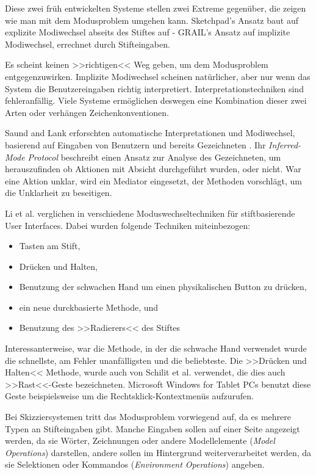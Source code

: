 \medskip Diese zwei früh entwickelten Systeme stellen zwei Extreme gegenüber, die zeigen wie man mit dem Modusproblem umgehen kann. Sketchpad's Ansatz baut auf explizite Modiwechsel abseits des Stiftes auf - GRAIL's Ansatz auf implizite Modiwechsel, errechnet durch Stifteingaben.

\medskip Es scheint keinen >>richtigen<< Weg geben, um dem Modusproblem entgegenzuwirken. Implizite Modiwechsel scheinen natürlicher, aber nur wenn das System die Benutzereingaben richtig interpretiert. Interpretationstechniken sind fehleranfällig. Viele Systeme ermöglichen deswegen eine Kombination dieser zwei Arten oder verhängen Zeichenkonventionen.

\medskip Saund and Lank erforschten automatische Interpretationen und Modiwechsel, basierend auf Eingaben von Benutzern und bereits Gezeichneten \citep{Saund:2003p66}. Ihr \emph{Inferred-Mode Protocol} beschreibt einen Ansatz zur Analyse des Gezeichneten, um herauszufinden ob Aktionen mit Absicht durchgeführt wurden, oder nicht. War eine Aktion unklar, wird ein Mediator eingesetzt, der Methoden vorschlägt, um die Unklarheit zu beseitigen.

\medskip Li et al. verglichen in \citep{Li:2005} verschiedene Moduswechseltechniken für stiftbasierende User Interfaces. Dabei wurden folgende Techniken miteinbezogen: 
\begin{itemize}
	\item Tasten am Stift,
	\item Drücken und Halten,
	\item Benutzung der schwachen Hand um einen physikalischen Button zu drücken,
	\item ein neue durckbasierte Methode, und
	\item Benutzung des >>Radierers<< des Stiftes
\end{itemize}

Interessanterweise, war die Methode, in der die schwache Hand verwendet wurde die schnellste, am Fehler unanfälligsten und die beliebteste. Die >>Drücken und Halten<< Methode, wurde auch von Schilit et al. \citep{Schilit:1998} verwendet, die dies auch >>Rast<<-Geste bezeichneten. Microsoft Windows for Tablet PCs benutzt diese Geste beispielsweise um die Rechtsklick-Kontextmenüs aufzurufen.

\medskip Bei Skizziersystemen tritt das Modusproblem vorwiegend auf, da es mehrere Typen an Stifteingaben gibt. Manche Eingaben sollen auf einer Seite angezeigt werden, da sie Wörter, Zeichnungen oder andere Modellelemente (\emph{Model Operations}) darstellen, andere sollen im Hintergrund weiterverarbeitet werden, da sie Selektionen oder Kommandos (\emph{Environment Operations}) angeben.

